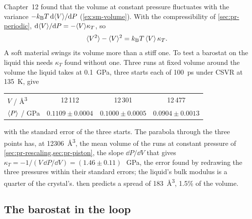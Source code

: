 Chapter~12 found that the volume at constant pressure fluctuates with the
variance $-k_{\mathrm{B}} T\,\mathrm{d}\langle V \rangle/\mathrm{d} P$ (\cref{ex:sm-volume}). With the
compressibility of \cref{sec:pr-periodic}, $\mathrm{d}\langle V \rangle/\mathrm{d} P =
-\langle V \rangle\kappa_T$, so
\begin{equation}
   \langle V^2 \rangle - \langle V \rangle^2 = k_{\mathrm{B}} T\,\langle V \rangle\,\kappa_T .
   \label{eq:pr-volume}
\end{equation}
A soft material swings its volume more than a stiff one. To test a
barostat on the liquid this needs $\kappa_T$ found without one. Three
runs at fixed volume around the volume the liquid takes at
\SI{0.1}{\giga\pascal}, three starts each of \SI{100}{\pico\second} under
CSVR at \SI{135}{\kelvin}, give
\begin{center}
\small
\begin{tabular}{@{}lccc@{}}
\toprule
$V$ / \si{\angstrom\cubed} & 12\,112 & 12\,301 & 12\,477\\
$\langle P \rangle$ / \si{\giga\pascal} & $0.1109 \pm 0.0004$ & $0.1000 \pm 0.0005$
   & $0.0904 \pm 0.0013$\\
\bottomrule
\end{tabular}
\end{center}
with the standard error of the three starts. The parabola through the
three points has, at \SI{12306}{\angstrom\cubed}, the mean volume of the
runs at constant pressure of \cref{sec:pr-rescaling,sec:pr-piston}, the
slope $\dd P/\dd V$ that gives $\kappa_T = -1/(V\,\dd P/\dd V) = (1.46 \pm
0.11)$\,\si{\per\giga\pascal}, the error found by redrawing the three
pressures within their standard errors; the liquid's bulk modulus is a
quarter of the crystal's.  then predicts a spread of
\SI{183}{\angstrom\cubed}, 1.5\% of the volume.

\subsection*{The barostat in the loop}

